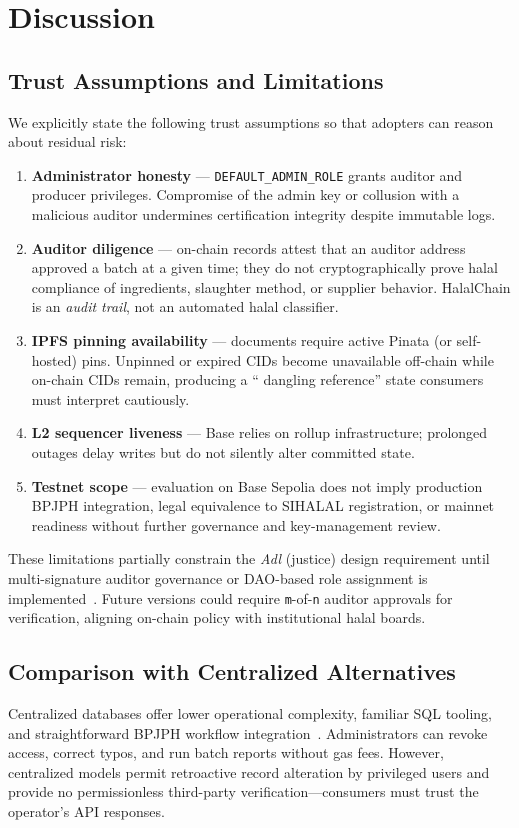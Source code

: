 \section{Discussion}
\label{sec:discussion}

\subsection{Trust Assumptions and Limitations}
We explicitly state the following trust assumptions so that adopters can reason about residual risk:

\begin{enumerate}
  \item \textbf{Administrator honesty} --- \texttt{DEFAULT\_ADMIN\_ROLE} grants auditor and producer privileges.
  Compromise of the admin key or collusion with a malicious auditor undermines certification integrity despite immutable logs.
  \item \textbf{Auditor diligence} --- on-chain records attest that an auditor address approved a batch at a given time; they do not cryptographically prove halal compliance of ingredients, slaughter method, or supplier behavior.
  HalalChain is an \emph{audit trail}, not an automated halal classifier.
  \item \textbf{IPFS pinning availability} --- documents require active Pinata (or self-hosted) pins.
  Unpinned or expired CIDs become unavailable off-chain while on-chain CIDs remain, producing a `` dangling reference'' state consumers must interpret cautiously.
  \item \textbf{L2 sequencer liveness} --- Base relies on rollup infrastructure; prolonged outages delay writes but do not silently alter committed state.
  \item \textbf{Testnet scope} --- evaluation on Base Sepolia does not imply production BPJPH integration, legal equivalence to SIHALAL registration, or mainnet readiness without further governance and key-management review.
\end{enumerate}

These limitations partially constrain the \emph{Adl} (justice) design requirement until multi-signature auditor governance or DAO-based role assignment is implemented~\cite{gnosis2024safe}.
Future versions could require \texttt{m}-of-\texttt{n} auditor approvals for verification, aligning on-chain policy with institutional halal boards.

\subsection{Comparison with Centralized Alternatives}
Centralized databases offer lower operational complexity, familiar SQL tooling, and straightforward BPJPH workflow integration~\cite{underwood2016blockchain,viriyasitavat2019blockchain}.
Administrators can revoke access, correct typos, and run batch reports without gas fees.
However, centralized models permit retroactive record alteration by privileged users and provide no permissionless third-party verification---consumers must trust the operator's API responses.


